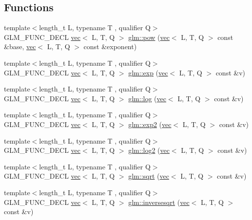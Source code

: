 \subsection*{Functions}
\begin{DoxyCompactItemize}
\item 
{\footnotesize template$<$length\+\_\+t L, typename T , qualifier Q$>$ }\\G\+L\+M\+\_\+\+F\+U\+N\+C\+\_\+\+D\+E\+CL \hyperlink{structglm_1_1vec}{vec}$<$ L, T, Q $>$ \hyperlink{group__core__func__exponential_ga2254981952d4f333b900a6bf5167a6c4}{glm\+::pow} (\hyperlink{structglm_1_1vec}{vec}$<$ L, T, Q $>$ const \&base, \hyperlink{structglm_1_1vec}{vec}$<$ L, T, Q $>$ const \&exponent)
\item 
{\footnotesize template$<$length\+\_\+t L, typename T , qualifier Q$>$ }\\G\+L\+M\+\_\+\+F\+U\+N\+C\+\_\+\+D\+E\+CL \hyperlink{structglm_1_1vec}{vec}$<$ L, T, Q $>$ \hyperlink{group__core__func__exponential_ga071566cadc7505455e611f2a0353f4d4}{glm\+::exp} (\hyperlink{structglm_1_1vec}{vec}$<$ L, T, Q $>$ const \&v)
\item 
{\footnotesize template$<$length\+\_\+t L, typename T , qualifier Q$>$ }\\G\+L\+M\+\_\+\+F\+U\+N\+C\+\_\+\+D\+E\+CL \hyperlink{structglm_1_1vec}{vec}$<$ L, T, Q $>$ \hyperlink{group__core__func__exponential_ga918c9f3fd086ce20e6760c903bd30fa9}{glm\+::log} (\hyperlink{structglm_1_1vec}{vec}$<$ L, T, Q $>$ const \&v)
\item 
{\footnotesize template$<$length\+\_\+t L, typename T , qualifier Q$>$ }\\G\+L\+M\+\_\+\+F\+U\+N\+C\+\_\+\+D\+E\+CL \hyperlink{structglm_1_1vec}{vec}$<$ L, T, Q $>$ \hyperlink{group__core__func__exponential_gaff17ace6b579a03bf223ed4d1ed2cd16}{glm\+::exp2} (\hyperlink{structglm_1_1vec}{vec}$<$ L, T, Q $>$ const \&v)
\item 
{\footnotesize template$<$length\+\_\+t L, typename T , qualifier Q$>$ }\\G\+L\+M\+\_\+\+F\+U\+N\+C\+\_\+\+D\+E\+CL \hyperlink{structglm_1_1vec}{vec}$<$ L, T, Q $>$ \hyperlink{group__core__func__exponential_ga82831c7d9cca777cebedfe03a19c8d75}{glm\+::log2} (\hyperlink{structglm_1_1vec}{vec}$<$ L, T, Q $>$ const \&v)
\item 
{\footnotesize template$<$length\+\_\+t L, typename T , qualifier Q$>$ }\\G\+L\+M\+\_\+\+F\+U\+N\+C\+\_\+\+D\+E\+CL \hyperlink{structglm_1_1vec}{vec}$<$ L, T, Q $>$ \hyperlink{group__core__func__exponential_gaa83e5f1648b7ccdf33b87c07c76cb77c}{glm\+::sqrt} (\hyperlink{structglm_1_1vec}{vec}$<$ L, T, Q $>$ const \&v)
\item 
{\footnotesize template$<$length\+\_\+t L, typename T , qualifier Q$>$ }\\G\+L\+M\+\_\+\+F\+U\+N\+C\+\_\+\+D\+E\+CL \hyperlink{structglm_1_1vec}{vec}$<$ L, T, Q $>$ \hyperlink{group__core__func__exponential_ga523dd6bd0ad9f75ae2d24c8e4b017b7a}{glm\+::inversesqrt} (\hyperlink{structglm_1_1vec}{vec}$<$ L, T, Q $>$ const \&v)
\end{DoxyCompactItemize}


